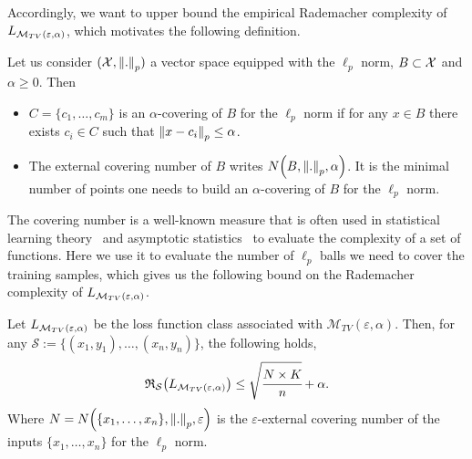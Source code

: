 Accordingly, we want to upper bound the empirical Rademacher complexity of  $\loss_{\mathcal{M}_{TV}\left(\varepsilon,\alpha\right)}$, which motivates the following definition. 
\begin{definition}
Let us consider $(\mathcal{X} , \norm{.}_p)$ a vector space equipped with the $\ell_p$ norm, $B \subset \mathcal{X}$ and $\alpha \geq 0$. Then 
\begin{itemize}
    \item $C =\{ {c_1}, \dots, {c_m} \}$ is an $\alpha$-covering of $B$ for the $\ell_p$ norm if for any $x  \in B$ there exists ${c_i} \in C$ such that $\norm{x  - {c_i}}_p \leq \alpha$.
    \item The external covering number of $B$ writes $N\left(B,\norm{.}_p,\alpha\right)$. It is the minimal number of points one needs to build an $\alpha$-covering of $B$ for the $\ell_p$ norm.
\end{itemize}
\end{definition}
The covering number is a well-known measure that is often used in statistical learning theory~\citep{shalev2014understanding} and asymptotic statistics~\citep{van2000asymptotic} to evaluate the complexity of a set of functions.
Here we use it to evaluate the number of $\ell_p$ balls we need to cover the training samples, which gives us the following bound on the Rademacher complexity of $\loss_{\mathcal{M}_{TV}\left(\varepsilon,\alpha\right)}$.

\begin{thm}
\label{thm:rad_tv}
Let $\loss_{\mathcal{M}_{TV}\left(\varepsilon,\alpha\right)}$ be the loss function class associated with $\mathcal{M}_{TV}\left(\varepsilon,\alpha\right)$. Then, for any $\mathcal{S}:=\{({x_1},y_1), \dots  , ({x_n},y_n)\}$, the following holds,
\begin{equation*}
    \mathfrak{R}_{\mathcal{S}}\left(\loss_{\mathcal{M}_{TV}\left(\varepsilon,\alpha\right)}\right ) \leq \sqrt{\cfrac{ N \times K }{n}}+\alpha.
\end{equation*}
 Where $N =N\left( \{{x_1},\dots , {x_n}\}, \norm{.}_p, \varepsilon \right)$ is the $\varepsilon$-external covering number of the inputs $\{{x_1},\dots , {x_n}\}$ for the $\ell_p$ norm.
\end{thm}

